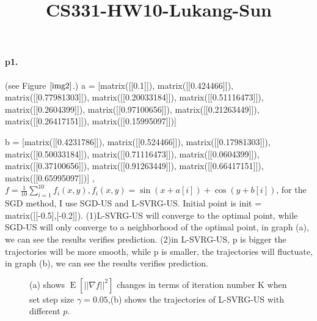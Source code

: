 \documentclass[12pt,a4paper]{article}
\title{CS331-HW10-Lukang-Sun}
\DeclareMathOperator{\E}{\mathrm{E}}
\begin{document}
	\maketitle
	\paragraph{p1.}
	(see Figure $\ref{img2}$.)
	a = [matrix([[0.1]]), matrix([[0.424466]]), matrix([[0.77981303]]), matrix([[0.20033184]]), matrix([[0.51116473]]), matrix([[0.2604399]]), matrix([[0.97100656]]), matrix([[0.21263449]]), matrix([[0.26417151]]), matrix([[0.15995097]])]
	
	b = [matrix([[0.4231786]]), matrix([[0.524466]]), matrix([[0.17981303]]), matrix([[0.50033184]]), matrix([[0.71116473]]), matrix([[0.0604399]]), matrix([[0.37100656]]), matrix([[0.91263449]]), matrix([[0.66417151]]), matrix([[0.65995097]])]
	,$f=\frac{1}{10}\sum_{i=1}^{10}f_i(x,y),f_i(x,y)=\sin(x+a[i])+\cos(y+b[i])$, for the SGD method, I use SGD-US and L-SVRG-US. Initial point is init = matrix([[-0.5],[-0.2]]).
	\newline 
	(1)L-SVRG-US will converge to the optimal point, while SGD-US will only converge to a neighborhood of the optimal point, in graph (a), we can see the results verifies  prediction.
	\newline
	(2)in L-SVRG-US, p is bigger the trajectories will be more smooth, while p is smaller, the trajectories will fluctuate, in graph (b), we can see the results verifies  prediction.
	\begin{figure}
		\centering
		
		
		\caption{ (a) shows $\E\left[||\nabla f||^2\right]$ changes in terms of iteration number K when set step size $\gamma = 0.05$,(b)  shows the trajectories of L-SVRG-US with different $p$.} %
		\label{img2}
	\end{figure}
\end{document}
